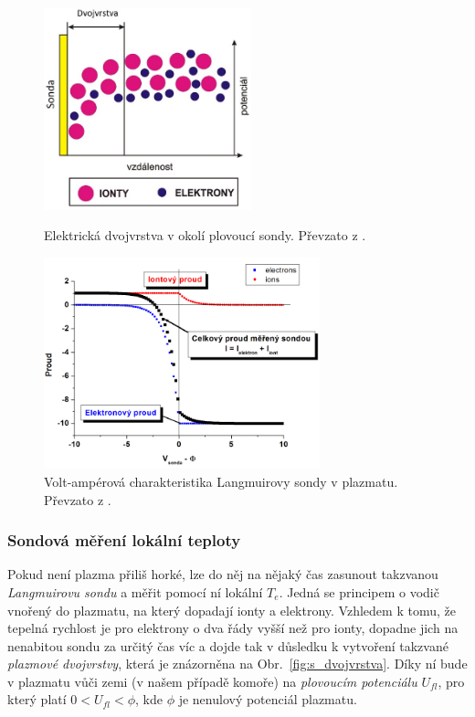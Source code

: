 \documentclass[english]{article}
\begin{document}
			\begin{figure}[h]
			\centering
			\begin{minipage}[t]{.40\textwidth}
			  \centering
							\includegraphics[width=6cm]{att/dvojvrstva.jpg}
							\caption{Elektrická dvojvrstva v okolí plovoucí sondy. Převzato z \cite{bib:zadani}.}
							\label{fig:s_dvojvrstva}
			\end{minipage}%
			\hfill
			\begin{minipage}[t]{.50\textwidth}
			  \centering
							\includegraphics[width=8cm]{att/va.png}
							\caption{Volt-ampérová charakteristika Langmuirovy sondy v plazmatu. Převzato z \cite{bib:zadani}.}
							\label{fig:s_va}
			\end{minipage}
			\end{figure}					
		
		\subsubsection{Sondová měření lokální teploty}
					Pokud není plazma přiliš horké, lze do něj na nějaký čas zasunout takzvanou \emph{Langmuirovu sondu} a měřit pomocí ní lokální $T_e$. Jedná se principem o vodič vnořený do plazmatu, na který dopadají ionty a elektrony. Vzhledem k tomu, že tepelná rychlost je pro elektrony o dva řády vyšší než pro ionty, dopadne jich na nenabitou sondu za určitý čas víc a dojde tak v důsledku k vytvoření takzvané \emph{plazmové dvojvrstvy}, která je znázorněna na Obr.~\ref{fig:s_dvojvrstva}. Díky ní bude v plazmatu vůči zemi (v našem případě komoře) na \emph{plovoucím potenciálu} $U_{fl}$, pro který platí $0 < U_{fl} < \phi$, kde $\phi$ je nenulový potenciál plazmatu.
		
\end{document}
